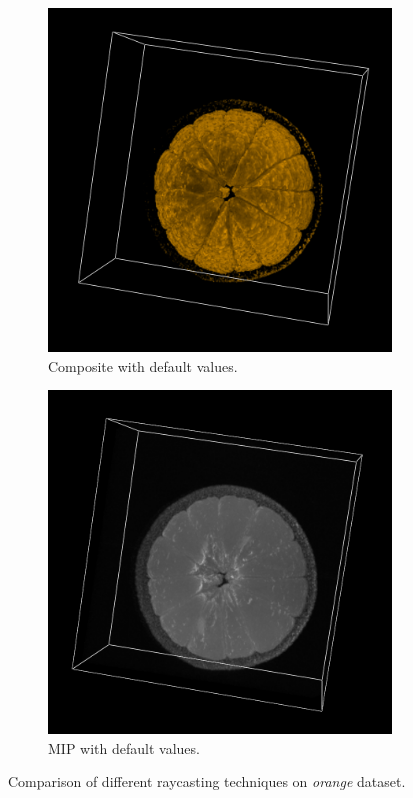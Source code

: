 \documentclass[a4paper]{article}
\begin{document}
\begin{figure}[h]
  \centering
  \begin{subfigure}[b]{0.45\textwidth}
    \centering
    \includegraphics[width=\textwidth]{orange-composite}
    \caption{Composite with default values.}
  \end{subfigure}
  \hfill
  \begin{subfigure}[b]{0.45\textwidth}
    \centering
    \includegraphics[width=\textwidth]{orange-mips}
    \caption{MIP with default values.}
  \end{subfigure}
  \caption{Comparison of different raycasting techniques on \textit{orange} dataset.}
  \label{fig:mipscomp}
\end{figure}
\end{document}
